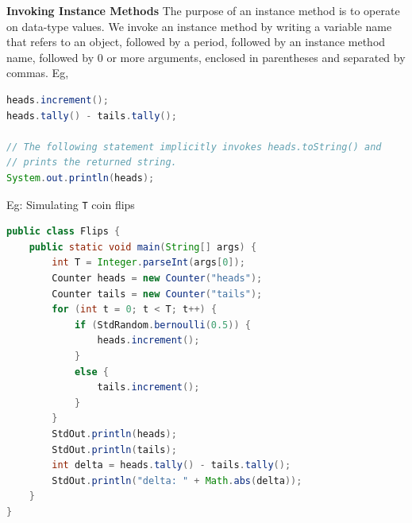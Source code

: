 \documentclass[8pt,a4paper,compress]{beamer}
\begin{document}
\begin{frame}[fragile]
\pause

\textbf{Invoking Instance Methods} The purpose of an instance method is to operate on data-type values. We invoke an instance method by writing a variable name that refers to an object, followed by a period, followed by an instance method name, followed by 0 or more arguments, enclosed in parentheses and separated by commas. Eg, 
\begin{lstlisting}[language=Java]
heads.increment();
heads.tally() - tails.tally();

// The following statement implicitly invokes heads.toString() and 
// prints the returned string.
System.out.println(heads); 
\end{lstlisting}

\pause
\smallskip

Eg: Simulating \lstinline$T$ coin flips

\begin{lstlisting}[language=Java]
public class Flips {
    public static void main(String[] args) {
        int T = Integer.parseInt(args[0]);
        Counter heads = new Counter("heads");
        Counter tails = new Counter("tails");
        for (int t = 0; t < T; t++) {
            if (StdRandom.bernoulli(0.5)) {
                heads.increment();
            }
            else {
                tails.increment();
            }
        }
        StdOut.println(heads);
        StdOut.println(tails);
        int delta = heads.tally() - tails.tally();
        StdOut.println("delta: " + Math.abs(delta));
    }
}
\end{lstlisting}
\end{frame}
\end{document}
